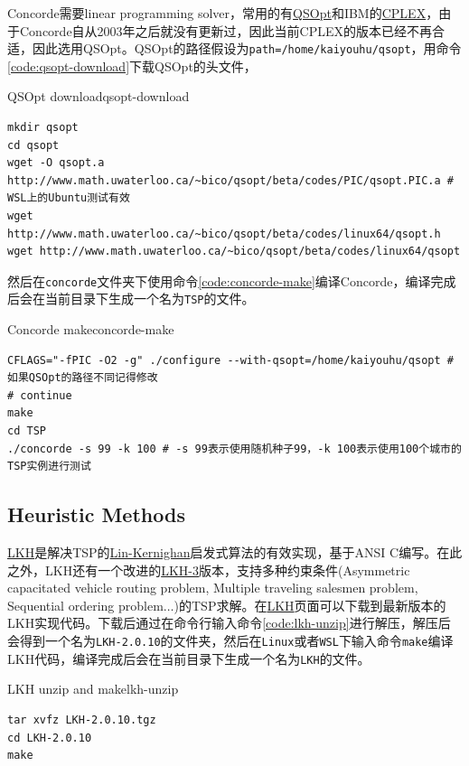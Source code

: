 Concorde需要linear programming solver，常用的有\href{https://www.math.uwaterloo.ca/~bico/qsopt/index.html}{QSOpt}和IBM的\href{https://www.ibm.com/products/ilog-cplex-optimization-studio/cplex-optimizer}{CPLEX}，由于Concorde自从2003年之后就没有更新过，因此当前CPLEX的版本已经不再合适，因此选用QSOpt。QSOpt的路径假设为\texttt{path=/home/kaiyouhu/qsopt}，用命令\ref{code:qsopt-download}下载QSOpt的头文件，

\begin{code}{QSOpt download}{qsopt-download}
\begin{verbatim}
mkdir qsopt
cd qsopt
wget -O qsopt.a http://www.math.uwaterloo.ca/~bico/qsopt/beta/codes/PIC/qsopt.PIC.a # WSL上的Ubuntu测试有效
wget http://www.math.uwaterloo.ca/~bico/qsopt/beta/codes/linux64/qsopt.h
wget http://www.math.uwaterloo.ca/~bico/qsopt/beta/codes/linux64/qsopt
\end{verbatim}
\end{code}

然后在\texttt{concorde}文件夹下使用命令\ref{code:concorde-make}编译Concorde，编译完成后会在当前目录下生成一个名为\texttt{TSP}的文件。

\begin{code}{Concorde make}{concorde-make}
\begin{verbatim}
CFLAGS="-fPIC -O2 -g" ./configure --with-qsopt=/home/kaiyouhu/qsopt # 如果QSOpt的路径不同记得修改
# continue
make
cd TSP
./concorde -s 99 -k 100 # -s 99表示使用随机种子99，-k 100表示使用100个城市的TSP实例进行测试
\end{verbatim}
\end{code}

\subsection{Heuristic Methods}
\href{http://akira.ruc.dk/~keld/research/LKH/}{LKH}是解决TSP的\href{https://www.wikiwand.com/en/articles/Lin%E2%80%93Kernighan_heuristic}{Lin-Kernighan}启发式算法的有效实现，基于ANSI C编写。在此之外，LKH还有一个改进的\href{http://akira.ruc.dk/~keld/research/LKH-3/}{LKH-3}版本，支持多种约束条件(Asymmetric capacitated vehicle routing problem, Multiple traveling salesmen problem, Sequential ordering problem$\dots$)的TSP求解。在\href{http://akira.ruc.dk/~keld/research/LKH/}{LKH}页面可以下载到最新版本的LKH实现代码。下载后通过在命令行输入命令\ref{code:lkh-unzip}进行解压，解压后会得到一个名为\texttt{LKH-2.0.10}的文件夹，然后在\texttt{Linux}或者\texttt{WSL}下输入命令\texttt{make}编译LKH代码，编译完成后会在当前目录下生成一个名为\texttt{LKH}的文件。

\begin{code}{LKH unzip and make}{lkh-unzip}
\begin{verbatim}
tar xvfz LKH-2.0.10.tgz
cd LKH-2.0.10
make
\end{verbatim}
\end{code}
